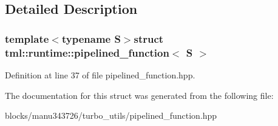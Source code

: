 \subsection{Detailed Description}
\subsubsection*{template$<$typename S$>$struct tml\+::runtime\+::pipelined\+\_\+function$<$ S $>$}



Definition at line 37 of file pipelined\+\_\+function.\+hpp.



The documentation for this struct was generated from the following file\+:\begin{DoxyCompactItemize}
\item 
blocks/manu343726/turbo\+\_\+utils/pipelined\+\_\+function.\+hpp\end{DoxyCompactItemize}
